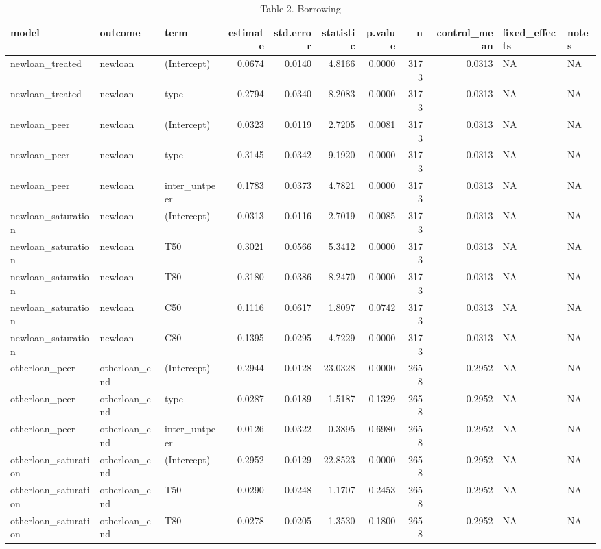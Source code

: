 \begin{table}

\caption{Table 2. Borrowing}
\centering
\begin{tabular}[t]{lllrrrrrrll}
\toprule
model & outcome & term & estimate & std.error & statistic & p.value & n & control\_mean & fixed\_effects & notes\\
\midrule
newloan\_treated & newloan & (Intercept) & 0.0674 & 0.0140 & 4.8166 & 0.0000 & 3173 & 0.0313 & NA & NA\\
newloan\_treated & newloan & type & 0.2794 & 0.0340 & 8.2083 & 0.0000 & 3173 & 0.0313 & NA & NA\\
newloan\_peer & newloan & (Intercept) & 0.0323 & 0.0119 & 2.7205 & 0.0081 & 3173 & 0.0313 & NA & NA\\
newloan\_peer & newloan & type & 0.3145 & 0.0342 & 9.1920 & 0.0000 & 3173 & 0.0313 & NA & NA\\
newloan\_peer & newloan & inter\_untpeer & 0.1783 & 0.0373 & 4.7821 & 0.0000 & 3173 & 0.0313 & NA & NA\\
\addlinespace
newloan\_saturation & newloan & (Intercept) & 0.0313 & 0.0116 & 2.7019 & 0.0085 & 3173 & 0.0313 & NA & NA\\
newloan\_saturation & newloan & T50 & 0.3021 & 0.0566 & 5.3412 & 0.0000 & 3173 & 0.0313 & NA & NA\\
newloan\_saturation & newloan & T80 & 0.3180 & 0.0386 & 8.2470 & 0.0000 & 3173 & 0.0313 & NA & NA\\
newloan\_saturation & newloan & C50 & 0.1116 & 0.0617 & 1.8097 & 0.0742 & 3173 & 0.0313 & NA & NA\\
newloan\_saturation & newloan & C80 & 0.1395 & 0.0295 & 4.7229 & 0.0000 & 3173 & 0.0313 & NA & NA\\
\addlinespace
otherloan\_peer & otherloan\_end & (Intercept) & 0.2944 & 0.0128 & 23.0328 & 0.0000 & 2658 & 0.2952 & NA & NA\\
otherloan\_peer & otherloan\_end & type & 0.0287 & 0.0189 & 1.5187 & 0.1329 & 2658 & 0.2952 & NA & NA\\
otherloan\_peer & otherloan\_end & inter\_untpeer & 0.0126 & 0.0322 & 0.3895 & 0.6980 & 2658 & 0.2952 & NA & NA\\
otherloan\_saturation & otherloan\_end & (Intercept) & 0.2952 & 0.0129 & 22.8523 & 0.0000 & 2658 & 0.2952 & NA & NA\\
otherloan\_saturation & otherloan\_end & T50 & 0.0290 & 0.0248 & 1.1707 & 0.2453 & 2658 & 0.2952 & NA & NA\\
\addlinespace
otherloan\_saturation & otherloan\_end & T80 & 0.0278 & 0.0205 & 1.3530 & 0.1800 & 2658 & 0.2952 & NA & NA\\

\end{tabular}
\end{table}

